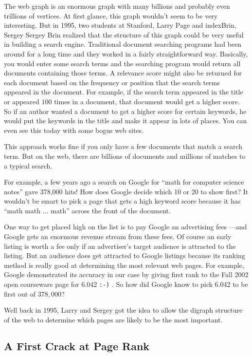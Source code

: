 \begin{example}
The web graph is an enormous graph with many billions and probably even
trillions of vertices.  At first glance, this graph wouldn't seem to be very
interesting.  But in 1995, two students at Stanford, 
Larry Page and index{Brin, Sergey} Sergey Brin realized that the structure
of this graph could be very useful in building a search engine.
Traditional document searching programs had been around for a long time
and they worked in a fairly straightforward way.  Basically, you would
enter some search terms and the searching program would return all
documents containing those terms.  A relevance score might also be
returned for each document based on the frequency or position that the
search terms appeared in the document.  For example, if the search term
appeared in the title or appeared $100$ times in a document, that document
would get a higher score.  So if an author wanted a document to get a
higher score for certain keywords, he would put the keywords in the title
and make it appear in lots of places.  You can even see this today with
some bogus web sites.

This approach works fine if you only have a few documents that match a
search term.  But on the web, there are billions of documents and millions
of matches to a typical search.

For example, a few years ago a search on Google for ``math for computer
science notes'' gave 378,000 hits!  How does Google decide which 10 or 20
to show first?  It wouldn't be smart to pick a page that gets a high
keyword score because it has ``math math $\dots$ math'' across the front
of the document.

One way to get placed high on the list is to pay Google an advertising
fees ---and Google gets an enormous revenue stream from these fees.  Of
course an early listing is worth a fee only if an advertiser's target
audience is attracted to the listing.  But an audience does get attracted
to Google listings because its ranking method is really good at
determining the most relevant web pages.  For example, Google demonstrated
its accuracy in our case by giving first rank to the Fall 2002 open
courseware page for 6.042 \texttt{:-)} .  So how did Google know to pick
6.042 to be first out of $378,000$?

Well back in 1995, Larry and Sergey got the idea to allow the digraph
structure of the web to determine which pages are likely to be the most
important.

\subsection{A First Crack at Page Rank}


\end{example}
